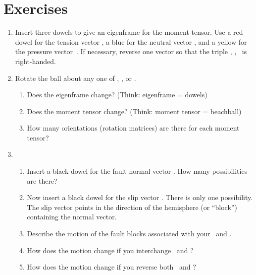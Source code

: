 \documentclass[11pt,titlepage,fleqn]{article}
\newcommand{\tvec}{\textcolor{red}{\mbt}}
\newcommand{\bvec}{\textcolor{blue}{\mbb}}
\newcommand{\pvec}{\textcolor{black}{\mbp}}
\newcommand{\nvec}{\mbn}
\newcommand{\svec}{\mbs}
\begin{document}

\section*{Exercises}

\begin{enumerate}
\item Insert three dowels to give an eigenframe for the moment tensor. Use a red dowel for the tension vector \tvec, a blue for the neutral vector \bvec, and a yellow for the pressure vector~\pvec. If necessary, reverse one vector so that the triple \tvec, \bvec, \pvec\ is right-handed.


\item Rotate the ball  about any one of \tvec, \bvec, or \pvec.
%
\begin{enumerate}
\item Does the eigenframe change? (Think: eigenframe = dowels)

\item Does the moment tensor change? (Think: moment tensor = beachball)

\item How many orientations (rotation matrices) are there for each moment tensor?

\end{enumerate}


\item

\begin{enumerate}
\item Insert a black dowel for the fault normal vector \nvec. How many possibilities are there?

\item Now insert a black dowel for the slip vector \svec. There is only one possibility. The slip vector points in the direction of the hemisphere (or ``block'') containing the normal vector.

\item Describe the motion of the fault blocks associated with your \nvec\ and \svec.

\item How does the motion change if you interchange \nvec\ and \svec?

\item How does the motion change if you reverse both \nvec\ and \svec?


\end{enumerate}
\end{enumerate}
\end{document}
